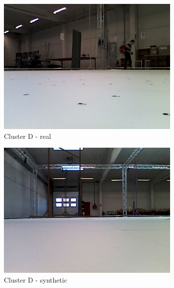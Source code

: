 \begin{figure}[h!]
   \centering
   \begin{subfigure}{0.29\textwidth}
      \includegraphics[width=\textwidth]{figure/tsne_random/D/8.png}
      \caption{Cluster D - real}
   \end{subfigure}
   \begin{subfigure}{0.29\textwidth}
      \includegraphics[width=\textwidth]{figure/tsne_random/D/9.png}
      \caption{Cluster D - synthetic}
   \end{subfigure}
   \begin{subfigure}{0.29\textwidth}

\end{subfigure}
\end{figure}
